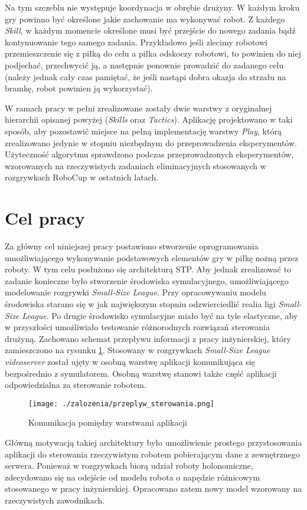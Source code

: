\begin{enumerate}
  Na tym szczeblu nie występuje koordynacja w obrębie drużyny. W każdym kroku gry powinno być określone jakie zachowanie ma wykonywać robot. Z każdego \textit{Skill}, w każdym momencie określone musi być przejście
  do nowego zadania bądź kontynuowanie tego samego zadania. Przykładowo jeśli zlecimy robotowi przemieszczenie się z piłką do celu a piłka 
  odskoczy robotowi, to powinien do niej podjechać, przechwycić ją, a następnie ponownie prowadzić do zadanego celu (należy jednak cały czas pamiętać, że jeśli nastąpi dobra okazja do strzału
na bramkę, robot powinien ją wykorzystać).
\end{enumerate}

 W ramach pracy w pełni zrealizowane zostały dwie warstwy z oryginalnej hierarchii opisanej powyżej (\textit{Skills} oraz \textit{Tactics}). Aplikację projektowano w taki sposób, aby pozostawić miejsce
 na pełną implementację warstwy \textit{Play}, którą zrealizowano jedynie w stopniu niezbędnym do przeprowadzenia eksperymentów.
Użyteczność algorytmu sprawdzono podczas przeprowadzonych eksperymentów, wzorowanych na rzeczywistych zadaniach eliminacyjnych stosowanych w rozgrywkach RoboCup w ostatnich latach.

\section{Cel pracy}
Za główny cel niniejszej pracy postawiono stworzenie oprogramowania umożliwiającego wykonywanie podstawowych elementów gry w piłkę nożną przez roboty. W tym celu posłużono się architekturą STP. Aby jednak zrealizować to zadanie konieczne było
stworzenie środowiska symulacyjnego, umożliwiającego modelowanie rozgrywki \emph{Small-Size League}. Przy opracowywaniu modelu środowiska starano się w jak największym stopniu odzwierciedlić realia
ligi \emph{Small-Size League}. Po drugie środowisko symulacyjne miało być na tyle elastyczne, aby w przyszłości umożliwiało testowanie różnorodnych rozwiązań sterowania drużyną.
Zachowano schemat przepływu informacji z pracy inżynierskiej, który zamieszczono na rysunku \ref{fig:przeplyw_sterowania}. Stosowany w rozgrywkach \emph{Small-Size League} \textit{videoserver} został
ujęty w osobną warstwę  aplikacji komunikująca się bezpośrednio z symulatorem. Osobną warstwę stanowi także część aplikacji odpowiedzialna za sterowanie robotem.
\begin{figure}[H]
\centering
\texttt{[image: ./zalozenia/przeplyw\_sterowania.png]}
\caption{Komunikacja pomiędzy warstwami aplikacji} \label{fig:przeplyw_sterowania}
\end{figure}
Główną motywacją takiej architektury było umożliwienie prostego przystosowania aplikacji do sterowania rzeczywistym robotem pobierającym dane z zewnętrznego serwera. 
Ponieważ w rozgrywkach biorą udział roboty holonomiczne, zdecydowano się na odejście od modelu robota o napędzie różnicowym stosowanego w pracy inżynierskiej. Opracowano zatem nowy model wzorowany na rzeczywistych
zawodnikach.

